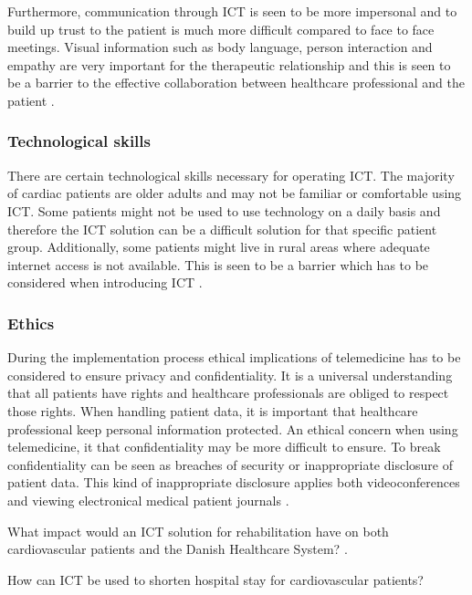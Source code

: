 Furthermore, communication through ICT is seen to be more impersonal and to build up trust to the patient is much more difficult compared to face to face meetings. Visual information such as body language, person interaction and empathy are very important for the therapeutic relationship and this is seen to be a barrier to the effective collaboration between healthcare professional and the patient \cite{barrier}.  

\subsubsection{Technological skills}
There are certain technological skills necessary for operating ICT. The majority of cardiac patients are older adults and may not be familiar or comfortable using ICT. Some patients might not be used to use technology on a daily basis and therefore the ICT solution can be a difficult solution for that specific patient group. Additionally, some patients might live in rural areas where adequate internet access is not available. This is seen to be a barrier which has to be considered when introducing ICT \cite{barrier}. 
   
\subsubsection{Ethics}
During the implementation process ethical implications of telemedicine has to be considered to ensure privacy and confidentiality. It is a universal understanding that all patients have rights and healthcare professionals are obliged to respect those rights. When handling patient data, it is important that healthcare professional keep personal information protected. An ethical concern when using telemedicine, it that confidentiality may be more difficult to ensure. To break confidentiality can be seen as breaches of security or inappropriate disclosure of patient data. This kind of inappropriate disclosure applies both videoconferences and viewing electronical medical patient journals \cite{etik}.  





What impact would an ICT solution for rehabilitation have on both cardiovascular patients and the Danish Healthcare System?
\cite{Healthconsensus}.


How can ICT be used to shorten hospital stay for cardiovascular patients?

